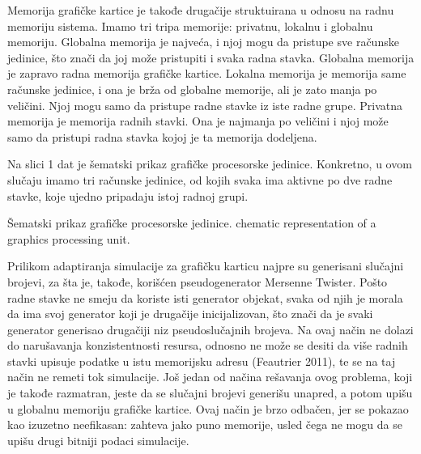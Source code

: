 Memorija grafičke kartice je takođe drugačije struktuirana u odnosu na radnu
memoriju sistema. Imamo tri tripa memorije: privatnu, lokalnu i globalnu memoriju.
Globalna memorija je najveća, i njoj mogu da pristupe sve računske jedinice, što znači
da joj može pristupiti i svaka radna stavka. Globalna memorija je zapravo radna
memorija grafičke kartice. Lokalna memorija je memorija same računske jedinice, i ona
je brža od globalne memorije, ali je zato manja po veličini. Njoj mogu samo da pristupe
radne stavke iz iste radne grupe. Privatna memorija je memorija radnih stavki. Ona je
najmanja po veličini i njoj može samo da pristupi radna stavka kojoj je ta memorija
dodeljena.

Na slici 1 dat je šematski prikaz grafičke procesorske jedinice. Konkretno, u
ovom slučaju imamo tri računske jedinice, od kojih svaka ima aktivne po dve radne
stavke, koje ujedno pripadaju istoj radnoj grupi.

    {Šematski prikaz grafičke procesorske jedinice.}
    {chematic representation of a graphics processing unit.}

Prilikom adaptiranja simulacije za grafičku karticu najpre su generisani slučajni
brojevi, za šta je, takođe, korišćen pseudogenerator Mersenne Twister. Pošto radne
stavke ne smeju da koriste isti generator objekat, svaka od njih je morala da ima svoj
generator koji je drugačije inicijalizovan, što znači da je svaki generator generisao
drugačiji niz pseudoslučajnih brojeva. Na ovaj način ne dolazi do narušavanja
konzistentnosti resursa, odnosno ne može se desiti da više radnih stavki upisuje
podatke u istu memorijsku adresu (Feautrier 2011), te se na taj način ne remeti tok
simulacije. Još jedan od načina rešavanja ovog problema, koji je takođe razmatran,
jeste da se slučajni brojevi generišu unapred, a potom upišu u globalnu memoriju
grafičke kartice. Ovaj način je brzo odbačen, jer se pokazao kao izuzetno neefikasan:
zahteva jako puno memorije, usled čega ne mogu da se upišu drugi bitniji podaci
simulacije.

